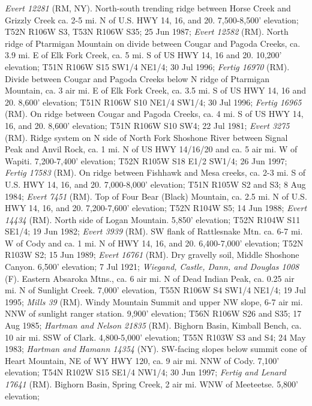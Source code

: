 \textit{Evert 12281} (RM, NY).
North-south trending ridge between Horse Creek and Grizzly Creek ca. 2-5 mi. N
of U.S. HWY 14, 16, and 20. 7,500-8,500' elevation; T52N R106W S3, T53N R106W
S35; 25 Jun 1987; \textit{Evert 12582} (RM).
North ridge of Ptarmigan Mountain on divide between Cougar and Pagoda Creeks,
ca. 3.9 mi. E of Elk Fork Creek, ca. 5 mi. S of US HWY 14, 16 and 20. 10,200'
elevation; T51N R106W S15 SW1/4 NE1/4; 30 Jul 1996; \textit{Fertig 16970} (RM).
Divide between Cougar and Pagoda Creeks below N ridge of Ptarmigan Mountain,
ca. 3 air mi. E of Elk Fork Creek, ca. 3.5 mi. S of US HWY 14, 16 and 20.
8,600' elevation; T51N R106W S10 NE1/4 SW1/4; 30 Jul 1996;
\textit{Fertig 16965} (RM).
On ridge between Cougar and Pagoda Creeks, ca. 4 mi. S of US HWY 14, 16, and 20.
8,600' elevation; T51N R106W S10 SW4; 22 Jul 1981; \textit{Evert 3275} (RM).
Ridge system on N side of North Fork Shoshone River between Signal Peak and
Anvil Rock, ca. 1 mi. N of US HWY 14/16/20 and ca. 5 air mi. W of Wapiti.
7,200-7,400' elevation; T52N R105W S18 E1/2 SW1/4; 26 Jun 1997;
\textit{Fertig 17583} (RM).
On ridge between Fishhawk and Mesa creeks, ca. 2-3 mi. S of U.S. HWY 14, 16,
and 20. 7,000-8,000' elevation; T51N R105W S2 and S3; 8 Aug 1984;
\textit{Evert 7451} (RM).
Top of Four Bear (Black) Mountain, ca. 2.5 mi. N of U.S. HWY 14, 16, and 20.
7,200-7,600' elevation; T52N R104W S5; 14 Jun 1988; \textit{Evert 14434} (RM).
North side of Logan Mountain. 5,850' elevation; T52N R104W S11 SE1/4;
19 Jun 1982; \textit{Evert 3939} (RM).
SW flank of Rattlesnake Mtn. ca. 6-7 mi. W of Cody and ca. 1 mi. N of HWY 14,
16, and 20. 6,400-7,000' elevation; T52N R103W S2; 15 Jun 1989;
\textit{Evert 16761} (RM).
Dry gravelly soil, Middle Shoshone Canyon. 6,500' elevation; 7 Jul 1921;
\textit{Wiegand, Castle, Dann, and Douglas 1008} (F).
Eastern Absaroka Mtns., ca. 6 air mi. N of Dead Indian Peak, ca. 0.25 air mi. N
of Sunlight Creek. 7,000' elevation, T55N R106W S4 SW1/4 NE1/4; 19 Jul 1995;
\textit{Mills 39} (RM).
Windy Mountain Summit and upper NW slope, 6-7 air mi. NNW of sunlight
ranger station. 9,900' elevation; T56N R106W S26 and S35; 17 Aug 1985;
\textit{Hartman and Nelson 21835} (RM).
Bighorn Basin, Kimball Bench, ca. 10 air mi. SSW of Clark. 4,800-5,000'
elevation; T55N R103W S3 and S4; 24 May 1983;
\textit{Hartman and Hamann 14354} (NY).
SW-facing slopes below summit cone of Heart Mountain, NE of WY HWY 120, ca. 9
air mi. NNW of Cody. 7,100' elevation; T54N R102W S15 SE1/4 NW1/4; 30 Jun 1997;
\textit{Fertig and Lenard 17641} (RM).
Bighorn Basin, Spring Creek, 2 air mi. WNW of Meeteetse. 5,800' elevation;
